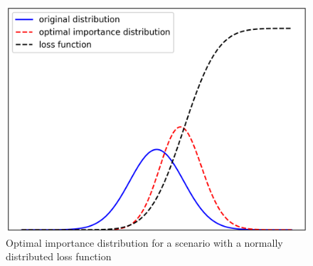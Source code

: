     \begin{figure}[H]
        \centering
        \includegraphics[scale=0.50]{Manuscript/Figures/Images/Methods/optimal_IS_dist_case3.png}
        \caption{Optimal importance distribution for a scenario with a normally distributed loss function}
        \label{fig:optimal_IS_dist_case3}
    \end{figure}